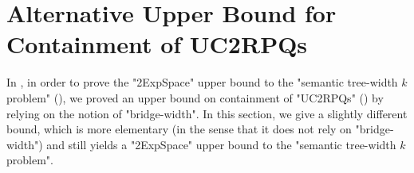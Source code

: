 

\section{\AP{}Alternative Upper Bound for Containment of UC2RPQs}
\label{apdx-sec:alternative-upper-bound-containment}

In , in order to prove the "2ExpSpace" upper bound to the 
"semantic tree-width $k$ problem" (), we proved an upper bound on containment
of "UC2RPQs" () by relying on the notion of "bridge-width".
In this section, we give a slightly different bound, which is more elementary (in the sense that it 
does not rely on "bridge-width") and still yields a "2ExpSpace" upper bound to the "semantic 
tree-width $k$ problem".

